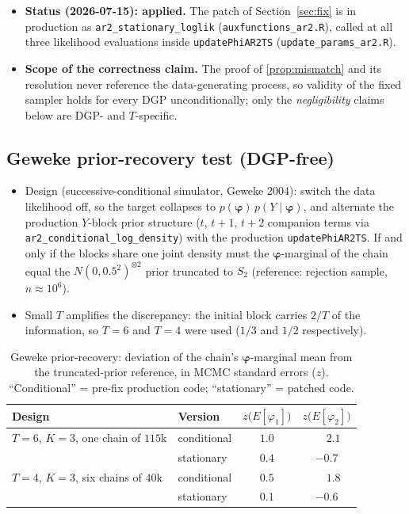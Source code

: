\documentclass[11pt]{article}
\newcommand{\sref}[1]{Section~\ref{#1}}
\newcommand{\bphi}{\boldsymbol{\varphi}}
\theoremstyle{plain}
\theoremstyle{definition}
\theoremstyle{remark}
\begin{document}
\begin{itemize}
  \item \textbf{Status (2026-07-15): applied.} The patch of \sref{sec:fix}
        is in production as \texttt{ar2\_stationary\_loglik}
        (\texttt{auxfunctions\_ar2.R}), called at all three likelihood
        evaluations inside \texttt{updatePhiAR2TS}
        (\texttt{update\_params\_ar2.R}).
  \item \textbf{Scope of the correctness claim.} The proof of
        \cref{prop:mismatch} and its resolution never reference the
        data-generating process, so validity of the fixed sampler holds for
        every DGP unconditionally; only the \emph{negligibility} claims below
        are DGP- and $T$-specific.
\end{itemize}

\subsection{Geweke prior-recovery test (DGP-free)}\label{sec:geweke}

\begin{itemize}
  \item Design (successive-conditional simulator, Geweke 2004): switch the
        data likelihood off, so the target collapses to
        $p(\bphi)\, p(Y \mid \bphi)$, and alternate the production
        $Y$-block prior structure ($t$, $t{+}1$, $t{+}2$ companion terms via
        \texttt{ar2\_conditional\_log\_density}) with the production
        \texttt{updatePhiAR2TS}. If and only if the blocks share one joint
        density must the $\bphi$-marginal of the chain equal the
        $N(0, 0.5^2)^{\otimes 2}$ prior truncated to $S_2$ (reference:
        rejection sample, $n \approx 10^6$).
  \item Small $T$ amplifies the discrepancy: the initial block carries
        $2/T$ of the information, so $T = 6$ and $T = 4$ were used
        ($1/3$ and $1/2$ respectively).
\end{itemize}

\begin{table}[ht]
\centering
\caption{Geweke prior-recovery: deviation of the chain's $\bphi$-marginal
         mean from the truncated-prior reference, in MCMC standard errors
         ($z$). ``Conditional'' = pre-fix production code; ``stationary'' =
         patched code.}
\label{tab:geweke}
\begin{tabular}{llcc}
\toprule
Design & Version & $z\bigl(E[\varphi_1]\bigr)$ & $z\bigl(E[\varphi_2]\bigr)$ \\
\midrule
$T=6$, $K=3$, one chain of $115$k
  & conditional & $1.0$ & $\phantom{-}2.1$ \\
  & stationary  & $0.4$ & $-0.7$ \\
\addlinespace
$T=4$, $K=3$, six chains of $40$k
  & conditional & $0.5$ & $\phantom{-}1.8$ \\
  & stationary  & $0.1$ & $-0.6$ \\
\bottomrule
\end{tabular}
\end{table}
\end{document}
